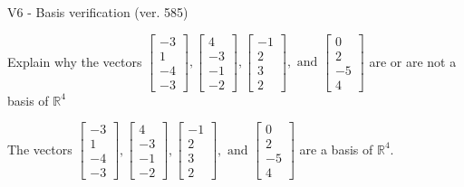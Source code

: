 \begin{exercise}
  \begin{exerciseTitle}V6 - Basis verification (ver. 585)\end{exerciseTitle}
  \begin{exerciseStatement}
    Explain why the vectors \(\left[\begin{array}{r}
-3 \\
1 \\
-4 \\
-3
\end{array}\right] , \left[\begin{array}{r}
4 \\
-3 \\
-1 \\
-2
\end{array}\right] , \left[\begin{array}{r}
-1 \\
2 \\
3 \\
2
\end{array}\right] , \text{ and } \left[\begin{array}{r}
0 \\
2 \\
-5 \\
4
\end{array}\right]\) are or are not a basis of \(\mathbb{R}^4\)	


  \end{exerciseStatement}
  \begin{exerciseAnswer}
   The vectors \(\left[\begin{array}{r}
-3 \\
1 \\
-4 \\
-3
\end{array}\right] , \left[\begin{array}{r}
4 \\
-3 \\
-1 \\
-2
\end{array}\right] , \left[\begin{array}{r}
-1 \\
2 \\
3 \\
2
\end{array}\right] , \text{ and } \left[\begin{array}{r}
0 \\
2 \\
-5 \\
4
\end{array}\right]\) 
  	 are  a basis of \(\mathbb{R}^4\).
  


  \end{exerciseAnswer}
\end{exercise}